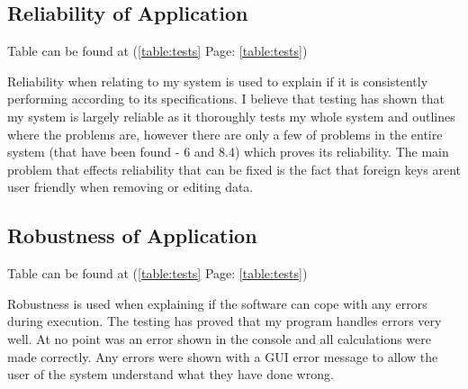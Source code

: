 \subsection{Reliability of Application}

Table can be found at (\ref{table:tests} Page: \ref{table:tests})

Reliability when relating to my system is used to explain if it is consistently performing according to its specifications. I believe that testing has shown that my system is largely reliable as it thoroughly tests my whole system and outlines where the problems are, however there are only a few of problems in the entire system (that have been found - 6 and 8.4) which proves its reliability. The main problem that effects reliability that can be fixed is the fact that foreign keys arent user friendly when removing or editing data.

\subsection{Robustness of Application}

Table can be found at (\ref{table:tests} Page: \ref{table:tests})

Robustness is used when explaining if the software can cope with any errors during execution. The testing has proved that my program handles errors very well. At no point was an error shown in the console and all calculations were made correctly. Any errors were shown with a GUI error message to allow the user of the system understand what they have done wrong.
